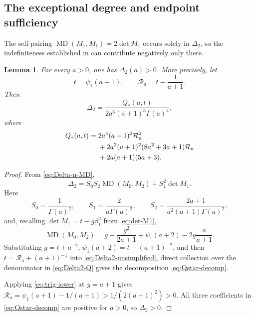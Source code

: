 \documentclass[11pt,a4paper]{amsart}
\numberwithin{equation}{section}
\theoremstyle{plain}
\newtheorem{lemma}[theorem]{Lemma}
\theoremstyle{definition}
\newcommand{\MD}{\operatorname{MD}}
\begin{document}
\subsection{The exceptional degree and endpoint sufficiency}\label{subsec:endpoint-sufficiency}

The self-pairing \(\MD(M_1,M_1)=2\det M_1\) occurs solely in \(\Delta_2\), so the
indefiniteness established in  can contribute negatively
only there.

\begin{lemma}\label{lem:Delta2-positive}
For every \(a>0\), one has \(\Delta_2(a)>0\).  More precisely, let
\[
 t=\psi_1(a+1),
 \qquad
 \mathcal R_a=t-\frac1{a+1}.
\]
Then
\begin{equation}\label{eq:Delta2-Q}
 \Delta_2=
 \frac{Q_*(a,t)}{2a^6(a+1)^3\Gamma(a)^4},
\end{equation}
where
\begin{align}
 Q_*(a,t)={}&2a^4(a+1)^2\mathcal R_a^2\notag\\
 &+2a^2(a+1)^2(8a^2+3a+1)\mathcal R_a\notag\\
 &+2a(a+1)(5a+3).\label{eq:Qstar-decomp}
\end{align}
\end{lemma}

\begin{proof}
From \eqref{eq:Delta-n-MD},
\begin{equation}\label{eq:Delta2-unsimplified}
 \Delta_2=S_0S_2\MD(M_0,M_2)+S_1^2\det M_1.
\end{equation}
Here
\[
 S_0=\frac1{\Gamma(a)^2},\qquad
 S_1=\frac2{a\Gamma(a)^2},\qquad
 S_2=\frac{2a+1}{a^2(a+1)\Gamma(a)^2},
\]
and, recalling
\(\det M_1=t-g\beta_1^2\) from \eqref{eq:det-M1},
\[
 \MD(M_0,M_2)
 =g+\frac{g^2}{2a+1}+\psi_1(a+2)
   -2g\frac{a}{a+1}.
\]
Substituting \(g=t+a^{-2}\), \(\psi_1(a+2)=t-(a+1)^{-2}\), and then
\(t=\mathcal R_a+(a+1)^{-1}\) into \eqref{eq:Delta2-unsimplified}, direct
collection over the denominator in \eqref{eq:Delta2-Q} gives the decomposition
\eqref{eq:Qstar-decomp}.

Applying \eqref{eq:trig-lower} at \(y=a+1\) gives
\(\mathcal R_a=\psi_1(a+1)-1/(a+1)>1/(2(a+1)^2)>0\).
All three coefficients in \eqref{eq:Qstar-decomp} are positive for \(a>0\),
so \(\Delta_2>0\).
\end{proof}
\end{document}
